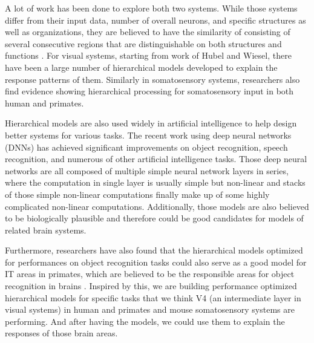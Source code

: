 \documentclass[12pt]{article}
\begin{document}
A lot of work has been done to explore both two systems. While those systems differ from their input data, number of overall neurons, and specific structures as well as organizations, they are believed to have the similarity of consisting of several consecutive regions that are distinguishable on both structures and functions \cite{felleman1991distributed}.
For visual systems, starting from work of Hubel and Wiesel\cite{Hubel1959}, there have been a large number of hierarchical models developed to explain the response patterns of them\cite{riesenhuber1999hierarchical, serre2007feedforward, fukushima1980neocognitron, bengio2009learning, pinto2009high}.
Similarly in somatosensory systems, researchers also find evidence showing hierarchical processing for somatosensory input in both human and primates\cite{Pons1987, Inui2004, Iwamura1998}.

Hierarchical models are also used widely in artificial intelligence to help design better systems for various tasks. The recent work using deep neural networks (DNNs) has achieved significant improvements on object recognition, speech recognition, and numerous of other artificial intelligence tasks\cite{Krizhevsky, hinton2012deep, lecun2015deep}. Those deep neural networks are all composed of multiple simple neural network layers in series, where the computation in single layer is usually simple but non-linear and stacks of those simple non-linear computations finally make up of some highly complicated non-linear computations. Additionally, those models are also believed to be biologically plausible and therefore could be good candidates for models of related brain systems.

Furthermore, researchers have also found that the hierarchical models optimized for performances on object recognition tasks could also serve as a good model for IT areas in primates, which are believed to be the responsible areas for object recognition in brains \cite{Yamins2013, Yamins2014, Cadieu2014}. Inspired by this, we are building performance optimized hierarchical models for specific tasks that we think V4 (an intermediate layer in visual systems) in human and primates and mouse somatosensory systems are performing. And after having the models, we could use them to explain the responses of those brain areas.
\end{document}
